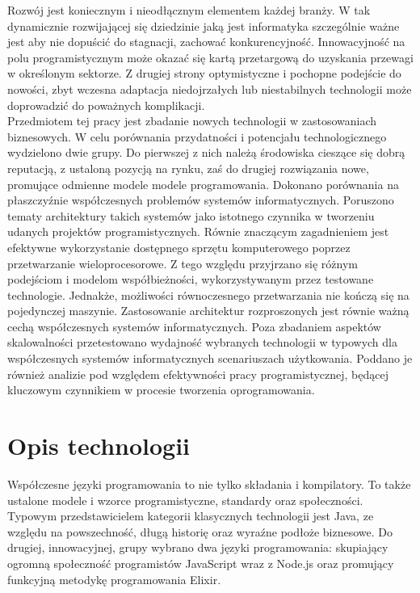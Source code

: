 \documentclass[12pt,twoside]{article}
\begin{document}
Rozwój jest koniecznym i nieodłącznym elementem każdej branży. W tak
dynamicznie rozwijającej się dziedzinie jaką jest informatyka
szczególnie ważne jest aby nie dopuścić do stagnacji, zachować
konkurencyjność. Innowacyjność na polu programistycznym może okazać się
kartą przetargową do uzyskania przewagi w określonym sektorze. Z drugiej
strony optymistyczne i pochopne podejście do nowości, zbyt wczesna
adaptacja niedojrzałych lub niestabilnych technologii może doprowadzić
do poważnych komplikacji.\\
Przedmiotem tej pracy jest zbadanie nowych technologii w zastosowaniach
biznesowych. W celu porównania przydatności i potencjału
technologicznego wydzielono dwie grupy. Do pierwszej z nich należą
środowiska cieszące się dobrą reputacją, z ustaloną pozycją na rynku,
zaś do drugiej rozwiązania nowe, promujące odmienne modele modele
programowania. Dokonano porównania na płaszczyźnie współczesnych
problemów systemów informatycznych. Poruszono tematy architektury takich
systemów jako istotnego czynnika w tworzeniu udanych projektów
programistycznych. Równie znaczącym zagadnieniem jest efektywne
wykorzystanie dostępnego sprzętu komputerowego poprzez przetwarzanie
wieloprocesorowe. Z tego względu przyjrzano się różnym podejściom i
modelom współbieżności, wykorzystywanym przez testowane technologie.
Jednakże, możliwości równoczesnego przetwarzania nie kończą się na
pojedynczej maszynie. Zastosowanie architektur rozproszonych jest równie
ważną cechą współczesnych systemów informatycznych. Poza zbadaniem
aspektów skalowalności przetestowano wydajność wybranych technologii w
typowych dla współczesnych systemów informatycznych scenariuszach
użytkowania. Poddano je również analizie pod względem efektywności pracy
programistycznej, będącej kluczowym czynnikiem w procesie tworzenia
oprogramowania.
\clearpage{}
	\clearpage{}\section{Opis technologii}\label{opis-technologii}

Współczesne języki programowania to nie tylko składania i kompilatory.
To także ustalone modele i wzorce programistyczne, standardy oraz
społeczności.\\
Typowym przedstawicielem kategorii klasycznych technologii jest Java, ze
względu na powszechność, długą historię oraz wyraźne podłoże biznesowe.
Do drugiej, innowacyjnej, grupy wybrano dwa języki programowania:
skupiający ogromną społeczność programistów JavaScript wraz z Node.js
oraz promujący funkcyjną metodykę programowania Elixir.
\end{document}
